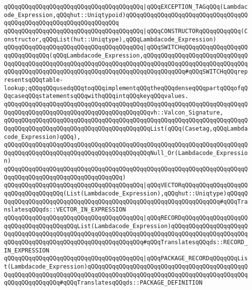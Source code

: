 \verb|qQQqqQQqqQQqqQQqqQQqqQQqqQQqqQQqqQQqqQQq|\verb#|qQQqEXCEPTION_TAGqQQq(Lambdacode_Expression,qQQqhut::Uniqtypoid)qQQqqQQqqQQqqQQqqQQqqQQqqQQqqQQqqQQqqQQqqQQqqQQqqQQqqQQqqQQqqQQqqQQq#\newline
\newline
\verb|qQQqqQQqqQQqqQQqqQQqqQQqqQQqqQQqqQQqqQQq|\verb#|qQQqCONSTRUCTORqQQqqQQqqQQq(Constructor,qQQqList(hut::Uniqtype),qQQqLambdacode_Expression)#\newline
\newline
\verb|qQQqqQQqqQQqqQQqqQQqqQQqqQQqqQQqqQQqqQQq|\verb#|qQQqSWITCHqQQqqQQqqQQqqQQqqQQqqQQqqQQqqQQq(qQQqLambdacode_Expression,qQQqqQQqqQQqqQQqqQQqqQQqqQQqqQQqqQQqqQQqqQQqqQQqqQQqqQQqqQQqqQQqqQQqqQQqqQQqqQQqqQQqqQQqqQQqqQQqqQQqqQQqqQQqqQQqqQQqqQQqqQQqqQQqqQQqqQQqqQQqqQQqqQQqqQQq#\verb|#qQQqSWITCHqQQqrepresentsqQQqtable-lookup;qQQqqQQqusedqQQqtoqQQqimplementqQQqtheqQQqdenseqQQqpartqQQqofqQQqcaseqQQqstatementsqQQqwithqQQqintqQQqkeyqQQqvalues.|\newline
\verb|qQQqqQQqqQQqqQQqqQQqqQQqqQQqqQQqqQQqqQQqqQQqqQQqqQQqqQQqqQQqqQQqqQQqqQQqqQQqqQQqqQQqqQQqqQQqqQQqqQQqqQQqqQQqqQQqvh::Valcon_Signature,|\newline
\verb|qQQqqQQqqQQqqQQqqQQqqQQqqQQqqQQqqQQqqQQqqQQqqQQqqQQqqQQqqQQqqQQqqQQqqQQqqQQqqQQqqQQqqQQqqQQqqQQqqQQqqQQqqQQqqQQqList(qQQq(Casetag,qQQqLambdacode_Expression)qQQq),|\newline
\verb|qQQqqQQqqQQqqQQqqQQqqQQqqQQqqQQqqQQqqQQqqQQqqQQqqQQqqQQqqQQqqQQqqQQqqQQqqQQqqQQqqQQqqQQqqQQqqQQqqQQqqQQqqQQqqQQqNull_Or(Lambdacode_Expression)|\newline
\verb|qQQqqQQqqQQqqQQqqQQqqQQqqQQqqQQqqQQqqQQqqQQqqQQqqQQqqQQqqQQqqQQqqQQqqQQqqQQqqQQqqQQqqQQqqQQqqQQqqQQqqQQq)|\newline
\newline
\verb|qQQqqQQqqQQqqQQqqQQqqQQqqQQqqQQqqQQqqQQq|\verb#|qQQqVECTORqQQqqQQqqQQqqQQqqQQqqQQqqQQqqQQqqQQq(List(Lambdacode_Expression),qQQqhut::Uniqtype)qQQqqQQqqQQqqQQqqQQqqQQqqQQqqQQqqQQqqQQqqQQqqQQqqQQqqQQqqQQqqQQqqQQq#\verb|#qQQqTranslatesqQQqds::VECTOR_IN_EXPRESSION|\newline
\verb|qQQqqQQqqQQqqQQqqQQqqQQqqQQqqQQqqQQqqQQq|\verb#|qQQqRECORDqQQqqQQqqQQqqQQqqQQqqQQqqQQqqQQqqQQqqQQqList(Lambdacode_Expression)qQQqqQQqqQQqqQQqqQQqqQQqqQQqqQQqqQQqqQQqqQQqqQQqqQQqqQQqqQQqqQQqqQQqqQQqqQQqqQQqqQQqqQQqqQQqqQQqqQQqqQQqqQQqqQQqqQQqqQQqqQQqqQQqqQQq#\verb|#qQQqTranslatesqQQqds::RECORD_IN_EXPRESSION|\newline
\verb|qQQqqQQqqQQqqQQqqQQqqQQqqQQqqQQqqQQqqQQq|\verb#|qQQqPACKAGE_RECORDqQQqqQQqList(Lambdacode_Expression)qQQqqQQqqQQqqQQqqQQqqQQqqQQqqQQqqQQqqQQqqQQqqQQqqQQqqQQqqQQqqQQqqQQqqQQqqQQqqQQqqQQqqQQqqQQqqQQqqQQqqQQqqQQqqQQqqQQqqQQqqQQqqQQqqQQq#\verb|#qQQqTranslatesqQQqds::PACKAGE_DEFINITION|\newline
